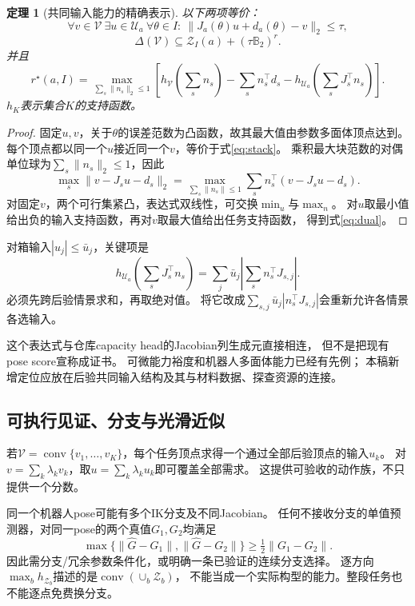 \documentclass[11pt,a4paper]{article}
\numberwithin{equation}{section}
\newtheorem{theorem}{定理}[section]
\theoremstyle{definition}
\newcommand{\B}{\mathbb B}
\newcommand{\U}{\mathcal U}
\newcommand{\V}{\mathcal V}
\DeclareMathOperator{\conv}{conv}
\begin{document}
\begin{theorem}[共同输入能力的精确表示]
以下两项等价：
\[
 \forall v\in\V\ \exists u\in\U_a\
 \forall\theta\in I:\ \|J_a(\theta)u+d_a(\theta)-v\|_2\le\tau,
\]
\begin{equation}
 \boxed{\Delta(\V)\subseteq\mathcal Z_I(a)+(\tau\B_2)^r.}
 \label{eq:stack}
\end{equation}
并且
\begin{equation}
 \boxed{
 r^\star(a,I)=
 \max_{\sum_s\|n_s\|_2\le1}
 \left[
 h_{\V}\!\left(\sum_s n_s\right)
 -\sum_s n_s^\top d_s
 -h_{\U_a}\!\left(\sum_sJ_s^\top n_s\right)
 \right].}
 \label{eq:dual}
\end{equation}
$h_K$表示集合$K$的支持函数。
\end{theorem}
\begin{proof}
固定$u,v$，关于$\theta$的误差范数为凸函数，故其最大值由参数多面体顶点达到。
每个顶点都以同一个$u$接近同一个$v$，等价于式\eqref{eq:stack}。
乘积最大块范数的对偶单位球为$\sum_s\|n_s\|_2\le1$，因此
\[
 \max_s\|v-J_su-d_s\|_2
 =\max_{\sum_s\|n_s\|\le1}\sum_s n_s^\top(v-J_su-d_s).
\]
对固定$v$，两个可行集紧凸，表达式双线性，可交换$\min_u$与$\max_n$。
对$u$取最小值给出负的输入支持函数，再对$v$取最大值给出任务支持函数，
得到式\eqref{eq:dual}。
\end{proof}

对箱输入$|u_j|\le\bar u_j$，关键项是
\begin{equation}
 h_{\U_a}\!\left(\sum_sJ_s^\top n_s\right)
 =\sum_j\bar u_j\left|\sum_s n_s^\top J_{s,j}\right|.
 \label{eq:generator}
\end{equation}
必须先跨后验情景求和，再取绝对值。
将它改成$\sum_{s,j}\bar u_j|n_s^\top J_{s,j}|$会重新允许各情景各选输入。

这个表达式与仓库capacity head的Jacobian列生成元直接相连，
但不是把现有pose score宣称成证书。
可微能力裕度和机器人多面体能力已经有先例\cite{sagar2023,murooka2025,forte2026}；
本稿新增定位应放在后验共同输入结构及其与材料数据、探查资源的连接。

\subsection{可执行见证、分支与光滑近似}
若$\V=\conv\{v_1,\ldots,v_K\}$，每个任务顶点求得一个通过全部后验顶点的输入$u_k$。
对$v=\sum_k\lambda_kv_k$，取$u=\sum_k\lambda_ku_k$即可覆盖全部需求。
这提供可验收的动作族，不只提供一个分数。

同一个机器人pose可能有多个IK分支及不同Jacobian。
任何不接收分支的单值预测器，对同一pose的两个真值$G_1,G_2$均满足
\[
 \max\{\|\widehat G-G_1\|,\|\widehat G-G_2\|\}\ge\tfrac12\|G_1-G_2\|.
\]
因此需分支/冗余参数条件化，或明确一条已验证的连续分支选择。
逐方向$\max_bh_{\mathcal Z_b}$描述的是$\conv(\cup_b\mathcal Z_b)$，
不能当成一个实际构型的能力。整段任务也不能逐点免费换分支。
\end{document}
